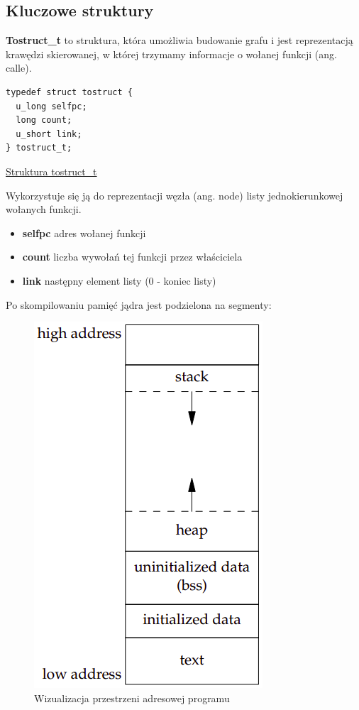 \documentclass[shortabstract]{iithesis}
\theoremstyle{definition} \newtheorem*{definition}{Definicja}
\theoremstyle{definition} \newtheorem*{example}{Przykład}
\theoremstyle{definition} \newtheorem*{remark}{Uwaga}
\newenvironment{longlisting}{\captionsetup{type=listing}}{}
\begin{document}
\subsection{Kluczowe struktury}

\textbf{Tostruct\_t} to struktura, która umożliwia budowanie grafu i jest reprezentacją krawędzi skierowanej, w której trzymamy informacje o wołanej funkcji (ang. calle).

\begin{longlisting}
  \begin{verbatim}
typedef struct tostruct {
  u_long selfpc;
  long count;
  u_short link;
} tostruct_t;
  \end{verbatim}
  \caption{\href{https://mimiker.ii.uni.wroc.pl/source/xref/mimiker/include/sys/gmon.h?r=27b8c19a\#102}{Struktura tostruct\_t}}
  \label{lst:structtostruct}
\end{longlisting}

 Wykorzystuje się ją do reprezentacji węzła (ang. node) listy jednokierunkowej wołanych funkcji.
 
\begin{itemize}
    \item \textbf{selfpc} adres wołanej funkcji
    \item \textbf{count} liczba wywołań tej funkcji przez właściciela
    \item \textbf{link} następny element listy (0 - koniec listy)
\end{itemize}

Po skompilowaniu pamięć jądra jest podzielona na segmenty:

\begin{figure}[ht]
\centering
\includegraphics[scale=0.4]{images/memory.png}
\caption{Wizualizacja przestrzeni adresowej programu \cite{bib:apue}}
\end{figure} 
\end{document}
